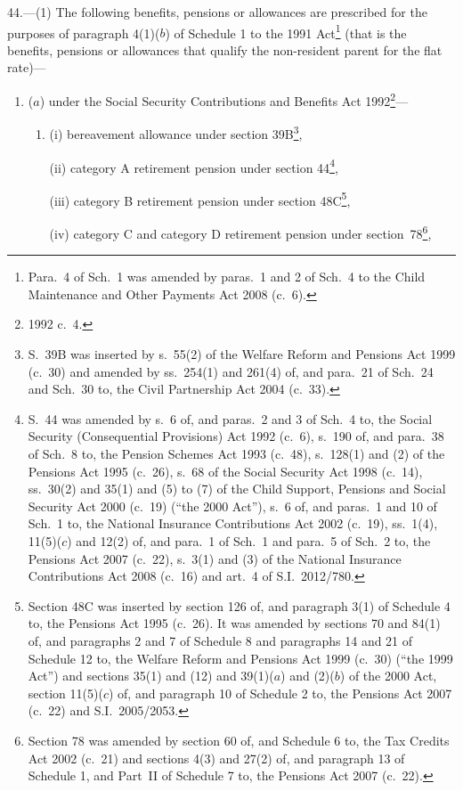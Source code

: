 \documentclass[12pt,a4paper]{article}
\begin{document}
44.---(1)  The following benefits, pensions or allowances are prescribed for the purposes of paragraph 4(1)($b$)  of Schedule 1 to the 1991 Act\footnote{Para.~4 of Sch.~1 was amended by paras.~1 and 2 of Sch.~4 to the Child Maintenance and Other Payments Act 2008 (c.~6).} (that is the benefits, pensions or allowances that qualify the non-resident parent for the flat rate)—
\begin{enumerate}\item[]
($a$) under the Social Security Contributions and Benefits Act 1992\footnote{1992 c.~4.}—
\begin{enumerate}\item[]
(i) bereavement allowance under section 39B\footnote{S.~39B was inserted by s.~55(2) of the Welfare Reform and Pensions Act 1999 (c.~30) and amended by ss.~254(1) and 261(4) of, and para.~21 of Sch.~24 and Sch.~30 to, the Civil Partnership Act 2004 (c.~33).},

(ii) category A retirement pension under section 44\footnote{S.~44 was amended by s.~6 of, and paras.~2 and 3 of Sch.~4 to, the Social Security (Consequential Provisions) Act 1992 (c.~6), s.~190 of, and para.~38 of Sch.~8 to, the Pension Schemes Act 1993 (c.~48), s.~128(1) and (2) of the Pensions Act 1995 (c.~26), s.~68 of the Social Security Act 1998 (c.~14), ss.~30(2) and 35(1) and (5) to (7) of the Child Support, Pensions and Social Security Act 2000 (c.~19) (“the 2000 Act”), s.~6 of, and paras.~1 and 10 of Sch.~1 to, the National Insurance Contributions Act 2002 (c.~19), ss.~1(4), 11(5)($c$)  and 12(2) of, and para.~1 of Sch.~1 and para.~5 of Sch.~2 to, the Pensions Act 2007 (c.~22), s.~3(1) and (3) of the National Insurance Contributions Act 2008 (c.~16) and art.~4 of S.I.~2012/780.},

(iii) category B retirement pension under section 48C\footnote{Section 48C was inserted by section 126 of, and paragraph 3(1) of Schedule 4 to, the Pensions Act 1995 (c.~26). It was amended by sections 70 and 84(1) of, and paragraphs 2 and 7 of Schedule 8 and paragraphs 14 and 21 of Schedule 12 to, the Welfare Reform and Pensions Act 1999 (c.~30) (“the 1999 Act”) and sections 35(1) and (12) and 39(1)($a$)  and (2)($b$)  of the 2000 Act, section 11(5)($c$)  of, and paragraph 10 of Schedule 2 to, the Pensions Act 2007 (c.~22) and S.I.~2005/2053.},

(iv) category C and category D retirement pension under section~78\footnote{Section 78 was amended by section 60 of, and Schedule 6 to, the Tax Credits Act 2002 (c.~21) and sections 4(3) and 27(2) of, and paragraph 13 of Schedule 1, and Part~II of Schedule 7 to, the Pensions Act 2007 (c.~22).},


\end{enumerate}
\end{enumerate}
\end{document}
